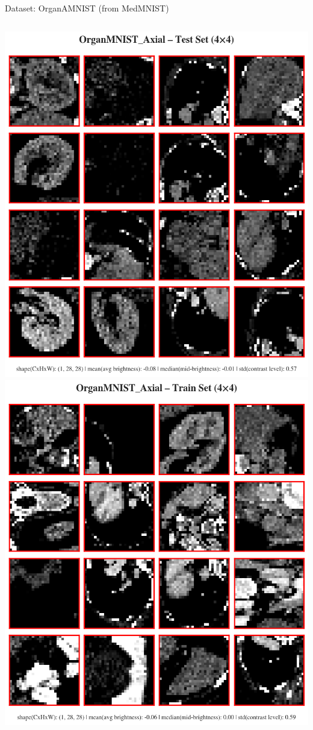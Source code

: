 \documentclass[10pt]{beamer}
\begin{document}
\begin{frame}{Dataset: OrganAMNIST (from MedMNIST)}
\begin{columns}[T,onlytextwidth]
      \centering
      \includegraphics[width=\linewidth,height=0.46\textheight,keepaspectratio]{test.png}\\[1ex]
      \includegraphics[width=\linewidth,height=0.46\textheight,keepaspectratio]{train.png}
  \end{columns}
\end{frame}
\end{document}
